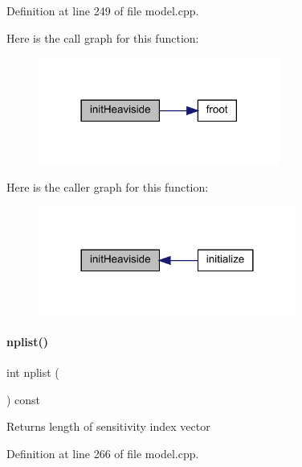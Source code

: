 Definition at line 249 of file model.\+cpp.

Here is the call graph for this function\+:
\nopagebreak
\begin{figure}[H]
\begin{center}
\leavevmode
\includegraphics[width=225pt]{classamici_1_1_model_afc1c1ffc33f397ed131f85c8321dd677_cgraph}
\end{center}
\end{figure}
Here is the caller graph for this function\+:
\nopagebreak
\begin{figure}[H]
\begin{center}
\leavevmode
\includegraphics[width=240pt]{classamici_1_1_model_afc1c1ffc33f397ed131f85c8321dd677_icgraph}
\end{center}
\end{figure}
\mbox{\label{classamici_1_1_model_a0f8e994055e37954d7746f3c1af27a5c}} 
\paragraph{\texorpdfstring{nplist()}{nplist()}}
{\footnotesize\ttfamily int nplist (\begin{DoxyParamCaption}{ }\end{DoxyParamCaption}) const}

\begin{DoxyReturn}{Returns}
length of sensitivity index vector 
\end{DoxyReturn}


Definition at line 266 of file model.\+cpp.

